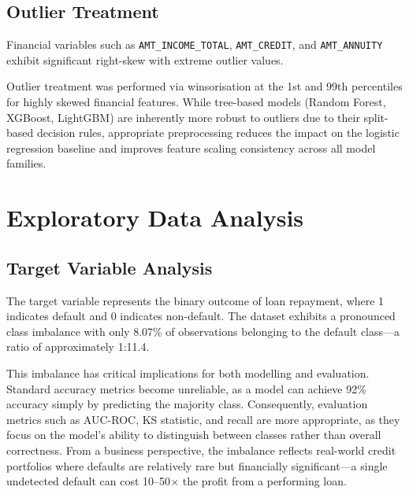 \subsection{Outlier Treatment}

Financial variables such as \texttt{AMT\_INCOME\_TOTAL}, \texttt{AMT\_CREDIT}, and \texttt{AMT\_ANNUITY} exhibit significant right-skew with extreme outlier values.



Outlier treatment was performed via winsorisation at the 1st and 99th percentiles for highly skewed financial features. While tree-based models (Random Forest, XGBoost, LightGBM) are inherently more robust to outliers due to their split-based decision rules, appropriate preprocessing reduces the impact on the logistic regression baseline and improves feature scaling consistency across all model families.

\section{Exploratory Data Analysis}
\label{sec:eda}

\subsection{Target Variable Analysis}
\label{subsec:target_analysis}

The target variable represents the binary outcome of loan repayment, where 1 indicates default and 0 indicates non-default. The dataset exhibits a pronounced class imbalance with only 8.07\% of observations belonging to the default class---a ratio of approximately 1:11.4.



This imbalance has critical implications for both modelling and evaluation. Standard accuracy metrics become unreliable, as a model can achieve 92\% accuracy simply by predicting the majority class. Consequently, evaluation metrics such as AUC-ROC, KS statistic, and recall are more appropriate, as they focus on the model's ability to distinguish between classes rather than overall correctness. From a business perspective, the imbalance reflects real-world credit portfolios where defaults are relatively rare but financially significant---a single undetected default can cost 10--50$\times$ the profit from a performing loan.

